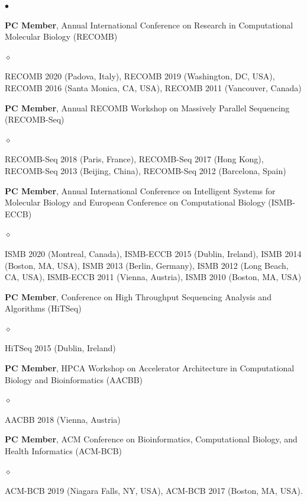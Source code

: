 \documentclass[margin,line]{res}
\newenvironment{list2}{
  \begin{list}{$\bullet$}{%
      \setlength{\itemsep}{0.1cm}
      \setlength{\parsep}{0in} \setlength{\parskip}{0in}
      \setlength{\topsep}{0in} \setlength{\partopsep}{0in} 
      \setlength{\leftmargin}{0.2in}}}{\end{list}}
\newenvironment{list3}{
  \begin{list}{$\diamond$}{%
      \setlength{\itemsep}{0in}
      \setlength{\parsep}{0.1cm} \setlength{\parskip}{0.1cm}
      \setlength{\topsep}{0.1cm} \setlength{\partopsep}{0.1cm} 
      \setlength{\leftmargin}{0.2in}}}{\end{list}}
\begin{document}
\begin{resume}
\begin{list2}
  \item
  \textbf{PC Member}, Annual International Conference on Research in Computational Molecular Biology (RECOMB)
  \begin{list3}
    \item RECOMB 2020 (Padova, Italy), RECOMB 2019 (Washington, DC, USA),  RECOMB 2016 (Santa Monica, CA, USA), RECOMB 2011 (Vancouver, Canada)
  \end{list3}
  
\item 
\textbf{PC Member},  Annual RECOMB Workshop on Massively Parallel Sequencing (RECOMB-Seq)
\begin{list3}
    \item RECOMB-Seq 2018 (Paris, France), RECOMB-Seq 2017 (Hong Kong), RECOMB-Seq 2013 (Beijing, China), RECOMB-Seq 2012 (Barcelona, Spain)
\end{list3}


\item
  \textbf{PC Member}, Annual International Conference on Intelligent Systems for Molecular Biology and  European Conference on 
  Computational Biology  (ISMB-ECCB)
  \begin{list3}
  \item ISMB 2020 (Montreal, Canada), ISMB-ECCB 2015 (Dublin, Ireland), ISMB 2014 (Boston, MA, USA), ISMB 2013 (Berlin, Germany), ISMB 2012 (Long Beach, CA, USA), ISMB-ECCB 2011 (Vienna, Austria), ISMB 2010 (Boston, MA, USA)
  \end{list3}


\item
  \textbf{PC Member}, Conference on High Throughput Sequencing Analysis and Algorithms (HiTSeq)
  \begin{list3}
      \item HiTSeq 2015 (Dublin, Ireland)
  \end{list3}

\item
  \textbf{PC Member}, 
HPCA Workshop on Accelerator Architecture in Computational Biology and Bioinformatics (AACBB)
\begin{list3}
    \item AACBB 2018 (Vienna, Austria)
\end{list3}
\item
  \textbf{PC Member},  ACM Conference on Bioinformatics, Computational Biology, and Health Informatics
  (ACM-BCB)
  \begin{list3}
    \item ACM-BCB 2019 (Niagara Falls, NY, USA), ACM-BCB 2017 (Boston, MA, USA).
  \end{list3}
  

\end{list2}
\end{resume}
\end{document}

